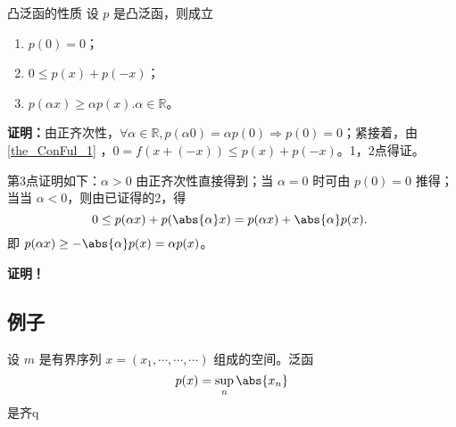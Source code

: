 \begin{theorem}{凸泛函的性质}
设 $p$ 是凸泛函，则成立
\begin{enumerate}
\item $p(0)=0$；
\item $0\leq p(x)+p(-x)$；
\item $p(\alpha x)\geq\alpha p(x).\alpha\in\mathbb R$。
\end{enumerate}
\end{theorem}

\textbf{证明：}由正齐次性，$\forall \alpha\in\mathbb R,p(\alpha 0)=\alpha p(0)\Rightarrow p(0)=0$；紧接着，由\autoref{the_ConFul_1} ，$0=f(x+(-x))\leq p(x)+p(-x)$。1，2点得证。

第3点证明如下：$\alpha>0$ 由正齐次性直接得到；当 $\alpha=0$ 时可由 $p(0)=0$ 推得；当当 $\alpha<0$，则由已证得的2，得
\begin{equation}
0\leq p(\alpha x)+p(\abs{\alpha} x)=p(\alpha x)+\abs{\alpha} p(x).~
\end{equation}
即 $p(\alpha x)\geq -\abs{\alpha}p(x)=\alpha p(x)$。



\textbf{证明！}


\subsection{例子}

\begin{example}{}
设 $m$ 是有界序列 $x=(x_1,\cdots,\cdots,\cdots)$ 组成的空间。泛函
\begin{equation}
p(x)=\sup_n\abs{x_n}
\end{equation}
是齐q

\end{example}






